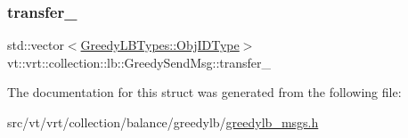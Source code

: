\subsubsection{\texorpdfstring{transfer\+\_\+}{transfer\_}}
{\footnotesize\ttfamily std\+::vector$<$\hyperlink{structvt_1_1vrt_1_1collection_1_1lb_1_1_greedy_l_b_types_ae22670acd689e4ff83315fac2e4acb5e}{Greedy\+L\+B\+Types\+::\+Obj\+I\+D\+Type}$>$ vt\+::vrt\+::collection\+::lb\+::\+Greedy\+Send\+Msg\+::transfer\+\_\+}



The documentation for this struct was generated from the following file\+:\begin{DoxyCompactItemize}
\item 
src/vt/vrt/collection/balance/greedylb/\hyperlink{greedylb__msgs_8h}{greedylb\+\_\+msgs.\+h}\end{DoxyCompactItemize}

